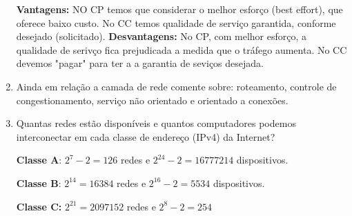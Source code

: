 \documentclass[10pt]{article}
\begin{document}
\begin{enumerate}
    \textbf{Vantagens: } NO CP temos que considerar o melhor esforço (best effort),
    que oferece baixo custo. No CC temos qualidade de serviço garantida, conforme
    desejado (solicitado).
    \textbf{Desvantagens: } No CP, com melhor esforço, a qualidade de serivço fica
    prejudicada a medida que o tráfego aumenta. No CC devemos "pagar" para ter
    a a garantia de seviços desejada.

    \item Ainda em relação a camada de rede comente sobre: roteamento, controle de 
    congestionamento, serviço não orientado e orientado a conexões. 

    \item Quantas redes estão disponíveis e quantos computadores podemos interconectar
    em cada classe de endereço (IPv4) da Internet?
    
    \textbf{Classe A}: \begin{math}2^7 - 2  = 126 \end{math} redes e 
    \begin{math}2^{24} - 2 = 16777214 \end{math} dispositivos.
    
    \textbf{Classe B}: \begin{math}2^{14} = 16384 \end{math} redes e 
    \begin{math}2^{16} - 2 = 5534\end{math} dispositivos.
    
    \textbf{Classe C:} \begin{math}2^{21} = 2097152 \end{math} redes e 
    \begin{math}2^8 - 2  = 254 \end{math}
\end{enumerate}
\end{document}
